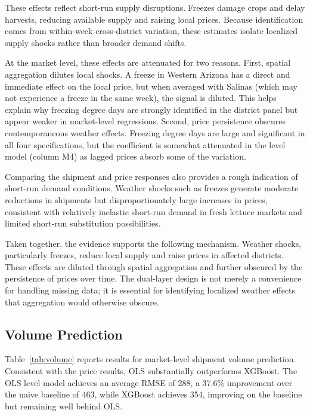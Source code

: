 \documentclass[12pt]{article}
\begin{document}
These effects reflect short-run supply disruptions. Freezes damage crops and delay harvests, reducing available supply and raising local prices. Because identification comes from within-week cross-district variation, these estimates isolate localized supply shocks rather than broader demand shifts.

At the market level, these effects are attenuated for two reasons. First, spatial aggregation dilutes local shocks. A freeze in Western Arizona has a direct and immediate effect on the local price, but when averaged with Salinas (which may not experience a freeze in the same week), the signal is diluted. This helps explain why freezing degree days are strongly identified in the district panel but appear weaker in market-level regressions. Second, price persistence obscures contemporaneous weather effects. Freezing degree days are large and significant in all four specifications, but the coefficient is somewhat attenuated in the level model (column M4) as lagged prices absorb some of the variation.

Comparing the shipment and price responses also provides a rough indication of short-run demand conditions. Weather shocks such as freezes generate moderate reductions in shipments but disproportionately large increases in prices, consistent with relatively inelastic short-run demand in fresh lettuce markets and limited short-run substitution possibilities.

Taken together, the evidence supports the following mechanism. Weather shocks, particularly freezes, reduce local supply and raise prices in affected districts. These effects are diluted through spatial aggregation and further obscured by the persistence of prices over time. The dual-layer design is not merely a convenience for handling missing data; it is essential for identifying localized weather effects that aggregation would otherwise obscure.

\subsection{Volume Prediction}
\label{subsec:volume}

Table~\ref{tab:volume} reports results for market-level shipment volume prediction. Consistent with the price results, OLS substantially outperforms XGBoost. The OLS level model achieves an average RMSE of 288, a 37.6\% improvement over the naive baseline of 463, while XGBoost achieves 354, improving on the baseline but remaining well behind OLS.
\end{document}
